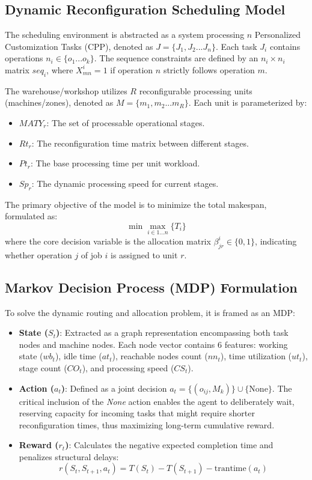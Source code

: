 \subsection{Dynamic Reconfiguration Scheduling Model}
The scheduling environment is abstracted as a system processing $n$ Personalized Customization Tasks (CPP), denoted as $J=\{J_{1},J_{2}...J_{n}\}$. Each task $J_{i}$ contains operations $n_{i}\in\{o_{1}...o_{k}\}$. The sequence constraints are defined by an $n_{i}\times n_{i}$ matrix $seq_{i}$, where $X_{mn}^{i}=1$ if operation $n$ strictly follows operation $m$. 

The warehouse/workshop utilizes $R$ reconfigurable processing units (machines/zones), denoted as $M=\{m_{1},m_{2}...m_{R}\}$. Each unit is parameterized by:
\begin{itemize}
    \item $MATY_{r}$: The set of processable operational stages.
    \item $Rt_{r}$: The reconfiguration time matrix between different stages.
    \item $Pt_{r}$: The base processing time per unit workload.
    \item $Sp_{r}$: The dynamic processing speed for current stages.
\end{itemize}
The primary objective of the model is to minimize the total makespan, formulated as:
\begin{equation}
    \min \max_{i\in 1...n}\{T_{i}\}
\end{equation}
where the core decision variable is the allocation matrix $\beta_{jr}^{i} \in \{0,1\}$, indicating whether operation $j$ of job $i$ is assigned to unit $r$.

\subsection{Markov Decision Process (MDP) Formulation}
To solve the dynamic routing and allocation problem, it is framed as an MDP:
\begin{itemize}
    \item \textbf{State ($S_t$)}: Extracted as a graph representation encompassing both task nodes and machine nodes. Each node vector contains 6 features: working state ($wb_t$), idle time ($at_t$), reachable nodes count ($nn_t$), time utilization ($ut_t$), stage count ($CO_t$), and processing speed ($CS_t$).
    \item \textbf{Action ($a_t$)}: Defined as a joint decision $a_{t}=\{(o_{ij},M_{k})\} \cup \{\text{None}\}$. The critical inclusion of the \textit{None} action enables the agent to deliberately wait, reserving capacity for incoming tasks that might require shorter reconfiguration times, thus maximizing long-term cumulative reward.
    \item \textbf{Reward ($r_t$)}: Calculates the negative expected completion time and penalizes structural delays:
    \begin{equation}
        r(S_{t},S_{t+1},a_{t}) = T(S_{t}) - T(S_{t+1}) - \text{trantime}(a_{t})
    \end{equation}
\end{itemize}

